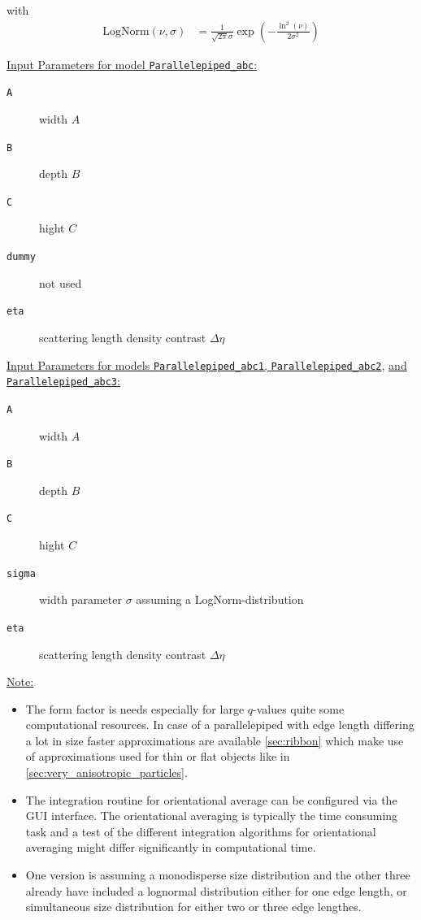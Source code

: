 with
\begin{align}
\textrm{LogNorm}(\nu,\sigma) &= \frac{1}{\sqrt{2\pi}\sigma} \exp\left(-\frac{\ln^2(\nu)}{2\sigma^2}\right)
\end{align}

\vspace{5mm}

\noindent \uline{Input Parameters for model \texttt{Parallelepiped\_abc}:}\\
\begin{description}
\item[\texttt{A}] width $A$
\item[\texttt{B}] depth $B$
\item[\texttt{C}] hight $C$
\item[\texttt{dummy}] not used
\item[\texttt{eta}] scattering length density contrast $\Delta\eta$
\end{description}

\noindent \uline{Input Parameters for models \texttt{Parallelepiped\_abc1}, \texttt{Parallelepiped\_abc2}}, \uline{and \texttt{Parallelepiped\_abc3}:}\\
\begin{description}
\item[\texttt{A}] width $A$
\item[\texttt{B}] depth $B$
\item[\texttt{C}] hight $C$
\item[\texttt{sigma}] width parameter $\sigma$ assuming a LogNorm-distribution
\item[\texttt{eta}] scattering length density contrast $\Delta\eta$
\end{description}

\noindent\uline{Note:}
\begin{itemize}
\item The form factor is needs especially for large $q$-values quite some computational resources. In case of a parallelepiped with edge length differing a lot in size faster approximations are available \ref{sec:ribbon} which make use of approximations used for thin or flat objects like in \ref{sec:very_anisotropic_particles}.
\item The integration routine for orientational average can be configured via the GUI interface. The orientational averaging is typically the time consuming task and a test of the different integration algorithms for orientational averaging might differ significantly in computational time.
\item One version is assuming a monodisperse size distribution and the other three already have included a lognormal distribution either for one edge length, or simultaneous size distribution for either two or three edge lengthes.
\end{itemize}

